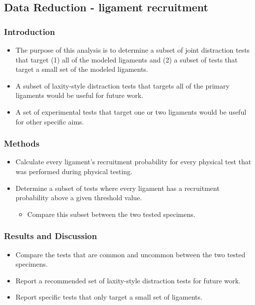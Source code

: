 \documentclass{article}
\begin{document}
\subsection{Data Reduction - ligament recruitment}
\subsubsection{Introduction}
\begin{itemize}
    \item The purpose of this analysis is to determine a subset of joint distraction tests that target (1) all of the modeled ligaments and (2) a subset of tests that target a small set of the modeled ligaments.
    \item A subset of laxity-style distraction tests that targets all of the primary ligaments would be useful for future work.
    \item A set of experimental tests that target one or two ligaments would be useful for other specific aims.
\end{itemize}
\subsubsection{Methods}
\begin{itemize}
    \item Calculate every ligament's recruitment probability for every physical test that was performed during physical testing.
    \item Determine a subset of tests where every ligament has a recruitment probability above a given threshold value.
    \begin{itemize}
        \item Compare this subset between the two tested specimens.
    \end{itemize}
\end{itemize}
\subsubsection{Results and Discussion}
\begin{itemize}
    \item Compare the tests that are common and uncommon between the two tested specimens.
    \item Report a recommended set of laxity-style distraction tests for future work.
    \item Report specific tests that only target a small set of ligaments.
\end{itemize}
\end{document}
